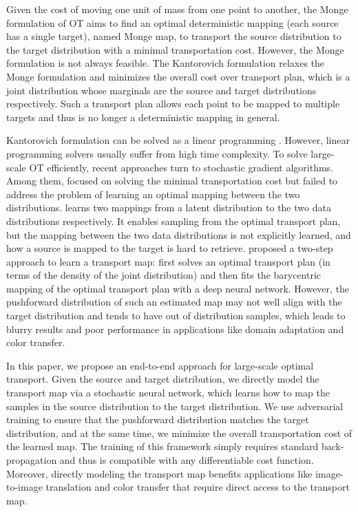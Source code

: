 \documentclass[runningheads]{llncs}
\begin{document}
Given the cost of moving one unit of mass from one point to another, the Monge formulation of OT aims to find an optimal deterministic mapping (each source has a single target), named Monge map, to transport the source distribution to the target distribution with a minimal transportation cost. However, the Monge formulation is not always feasible. The Kantorovich formulation relaxes the Monge formulation and minimizes the overall cost over transport plan, which is a joint distribution whose marginals are the source and target distributions respectively. Such a transport plan allows each point to be mapped to multiple targets and thus is no longer a deterministic mapping in general. 

Kantorovich formulation can be solved as a linear programming \cite{network_simplex}. However, linear programming solvers usually suffer from high time complexity. To solve large-scale OT efficiently, recent approaches turn to stochastic gradient algorithms. Among them, \cite{largescale_semidual,wgan} focused on solving the minimal transportation cost but failed to address the problem of learning an optimal mapping between the two distributions. \cite{spot} learns two mappings from a latent distribution to the two data distributions respectively. It enables sampling from the optimal transport plan, but the mapping between the two data distributions is not explicitly learned, and how a source is mapped to the target is hard to retrieve. \cite{large-scale} proposed a two-step approach to learn a transport map: first solves an optimal transport plan (in terms of the density of the joint distribution) and then fits the barycentric mapping of the optimal transport plan with a deep neural network. However, the pushforward distribution of such an estimated map may not well align with the target distribution and tends to have out of distribution samples, which leads to blurry results and poor performance in applications like domain adaptation and color transfer. 

In this paper, we propose an end-to-end approach for large-scale optimal transport. Given the source and target distribution, we directly model the transport map via a stochastic neural network, which learns how to map the samples in the source distribution to the target distribution. We use adversarial training to ensure that the pushforward distribution matches the target distribution, and at the same time, we minimize the overall transportation cost of the learned map. The training of this framework simply requires standard back-propagation and thus is compatible with any differentiable cost function. Moreover, directly modeling the transport map benefits applications like image-to-image translation and color transfer that require direct access to the transport map. 
\end{document}
